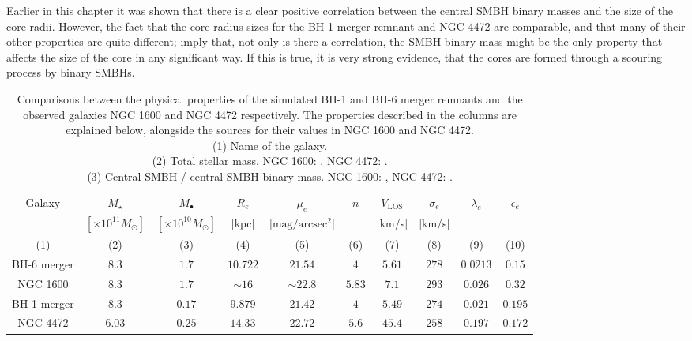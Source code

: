 \documentclass[english, oneside]{HYgradu}
\begin{document}
Earlier in this chapter it was shown that there is a clear positive correlation between the central SMBH binary masses and the size of the core radii. However, the fact that the core radius sizes for the BH-1 merger remnant and NGC 4472 are comparable, and that many of their other properties are quite different; imply that, not only is there a correlation, the SMBH binary mass might be the only property that affects the size of the core in any significant way. If this is true, it is very strong evidence, that the cores are formed through a scouring process by binary SMBHs.


\begin{table}
	\begin{center}
		\scriptsize
		\begin{tabular}{c c c c c c c c c c}
		\hline
		\hline
		Galaxy & $M_\star$ & $M_\bullet$ & $R_e$ & $\mu_e$ & $n$ & 
		$V_\mathrm{LOS}$ & $\sigma_e$ & $\lambda_e$ &
		$\epsilon_e$ \\
		& $[\times 10^{11} M_\odot]$ & $[\times 10^{10} M_\odot]$ &
		[kpc] & [$\mathrm{mag/arcsec^2}$] & & [km/s] & [km/s] & & \\
		(1) & (2) & (3) & (4) & (5) & (6) & (7) & (8) & (9) & (10) \\
		\hline
		BH-6 merger & $8.3$ & $1.7$ & $10.722$ & $21.54$ & $4$ & $5.61$ & $278$ & $0.0213$ & $0.15$ \\
		NGC 1600 & $8.3$ & $1.7$ & $\sim 16$ & $\sim 22.8$ & $5.83$ & $7.1$ & $293$ & $0.026$ & $0.32$ \\
		\hdashline
		BH-1 merger & $8.3$ & $0.17$ & $9.879$ & $21.42$ & $4$ & $5.49$ & $274$ & $0.021$ & $0.195$ \\
		NGC 4472 & $6.03$ & $0.25$ & $14.33$ & $22.72$ & $5.6$ & $45.4$ & 
		$258$ & $0.197$ & $0.172$ \\
		\hline
		\end{tabular}
	\end{center}
	\caption{Comparisons between the physical properties of the simulated BH-1 and BH-6 merger remnants and the observed galaxies NGC 1600 and NGC 4472 respectively. The properties described in the columns are explained below, alongside the sources for their values in NGC 1600 and NGC 4472. \\
	(1) Name of the galaxy. \\
	(2) Total stellar mass. NGC 1600: \cite{Thomas2016}, NGC 4472: \cite{Veale2018lambda}. \\
	(3) Central SMBH / central SMBH binary mass. NGC 1600:  \cite{Thomas2016}, NGC 4472: \cite{Rusli2013_BHmass}. \\
}
\end{table}
\end{document}

